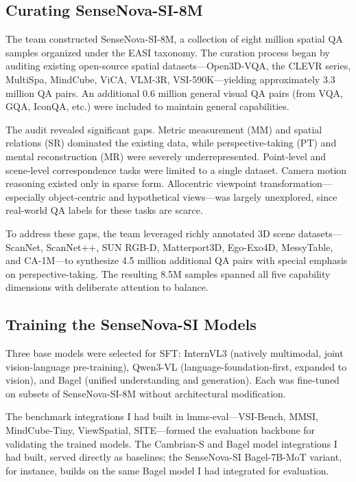 \documentclass[
hf,
]{confart}
\begin{document}
\subsection{Curating SenseNova-SI-8M}

The team constructed SenseNova-SI-8M, a collection of eight million spatial QA samples organized under the EASI taxonomy. The curation process began by auditing existing open-source spatial datasets---Open3D-VQA, the CLEVR series, MultiSpa, MindCube, ViCA, VLM-3R, VSI-590K---yielding approximately 3.3 million QA pairs. An additional 0.6 million general visual QA pairs (from VQA, GQA, IconQA, etc.) were included to maintain general capabilities.

The audit revealed significant gaps. Metric measurement (MM) and spatial relations (SR) dominated the existing data, while perspective-taking (PT) and mental reconstruction (MR) were severely underrepresented. Point-level and scene-level correspondence tasks were limited to a single dataset. Camera motion reasoning existed only in sparse form. Allocentric viewpoint transformation---especially object-centric and hypothetical views---was largely unexplored, since real-world QA labels for these tasks are scarce.

To address these gaps, the team leveraged richly annotated 3D scene datasets---ScanNet, ScanNet++, SUN RGB-D, Matterport3D, Ego-Exo4D, MessyTable, and CA-1M---to synthesize 4.5 million additional QA pairs with special emphasis on perspective-taking. The resulting 8.5M samples spanned all five capability dimensions with deliberate attention to balance.

\subsection{Training the SenseNova-SI Models}

Three base models were selected for SFT: InternVL3 (natively multimodal, joint vision-language pre-training), Qwen3-VL (language-foundation-first, expanded to vision), and Bagel (unified understanding and generation). Each was fine-tuned on subsets of SenseNova-SI-8M without architectural modification.

The benchmark integrations I had built in lmms-eval---VSI-Bench, MMSI, MindCube-Tiny, ViewSpatial, SITE---formed the evaluation backbone for validating the trained models. The Cambrian-S and Bagel model integrations I had built, served directly as baselines; the SenseNova-SI Bagel-7B-MoT variant, for instance, builds on the same Bagel model I had integrated for evaluation.
\end{document}
